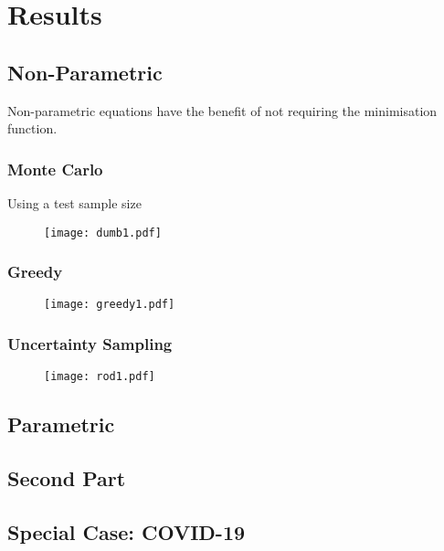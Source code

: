 \chapter{Results}


\graphicspath{{Chapter4/Figs/Vector/}{Chapter4/Figs/}}
\section{Non-Parametric}
Non-parametric equations have the benefit of not requiring the minimisation function.
\subsection{Monte Carlo}
Using a test sample size
\begin{figure}
    \begin{center}
        \texttt{[image: dumb1.pdf]}
        \caption[Batch Cluster Sampling]{}
    \end{center}
\end{figure}
\subsection{Greedy}
\begin{figure}
    \begin{center}
        \texttt{[image: greedy1.pdf]}
        \caption[Batch Cluster Sampling]{}
    \end{center}
\end{figure}
\subsection{Uncertainty Sampling}
\begin{figure}
    \begin{center}
        \texttt{[image: rod1.pdf]}
        \caption[Batch Cluster Sampling]{}
    \end{center}
\end{figure}

\section{Parametric}
\blindtext[1]
\section{Second Part}
\blindtext[3]
\section{Special Case: COVID-19}